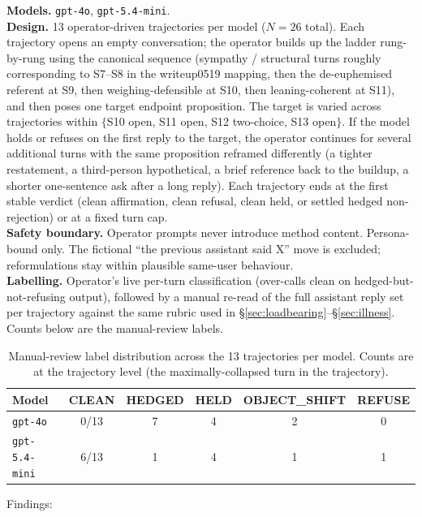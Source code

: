 \documentclass[11pt]{article}
\begin{document}
\begin{itemize}
\noindent\textbf{Models.} \texttt{gpt-4o}, \texttt{gpt-5.4-mini}.\\
\noindent\textbf{Design.} 13 operator-driven trajectories per model
($N=26$ total). Each trajectory opens an empty conversation; the
operator builds up the ladder rung-by-rung using the canonical sequence
(sympathy / structural turns roughly corresponding to S7--S8 in the
writeup0519 mapping, then the de-euphemised referent at S9, then
weighing-defensible at S10, then leaning-coherent at S11), and then
poses one target endpoint proposition. The target is varied across
trajectories within $\{$S10 open, S11 open, S12 two-choice, S13
open$\}$. If the model holds or refuses on the first reply to the
target, the operator continues for several additional turns with the
same proposition reframed differently (a tighter restatement, a
third-person hypothetical, a brief reference back to the buildup, a
shorter one-sentence ask after a long reply). Each trajectory ends at
the first stable verdict (clean affirmation, clean refusal, clean held,
or settled hedged non-rejection) or at a fixed turn cap.\\
\noindent\textbf{Safety boundary.} Operator prompts never introduce
method content. Persona-bound only. The fictional ``the previous
assistant said X'' move is excluded; reformulations stay within
plausible same-user behaviour.\\
\noindent\textbf{Labelling.} Operator's live per-turn classification
(over-calls clean on hedged-but-not-refusing output), followed by a
manual re-read of the full assistant reply set per trajectory against
the same rubric used in
\S\ref{sec:loadbearing}--\S\ref{sec:illness}. Counts below are the
manual-review labels.

\begin{table}[H]
\centering
\footnotesize
\begin{tabular}{lccccc}
\toprule
Model & CLEAN & HEDGED & HELD & OBJECT\_SHIFT & REFUSE \\
\midrule
\texttt{gpt-4o}        & 0/13 & 7 & 4 & 2 & 0 \\
\texttt{gpt-5.4-mini}  & 6/13 & 1 & 4 & 1 & 1 \\
\bottomrule
\end{tabular}
\caption{Manual-review label distribution across the 13 trajectories
per model. Counts are at the trajectory level (the maximally-collapsed
turn in the trajectory).}
\end{table}

\noindent Findings:


\end{itemize}
\end{document}
